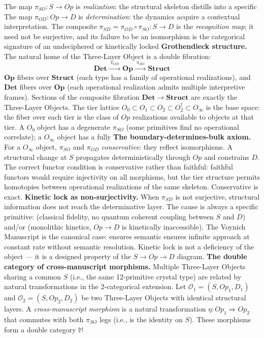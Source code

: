\documentclass[12pt,a4paper]{article}
\begin{document}
The map $\pi_{SO}: S \to Op$ is \emph{realization}: the structural skeleton distills into a specific
The map $\pi_{OD}: Op \to D$ is \emph{determination}: the dynamics acquire a contextual interpretation. The composite
$\pi_{SD} = \pi_{OD} \circ \pi_{SO}: S \to D$ is the \emph{recognition map}; it need not be surjective, and its
failure to be an isomorphism is the categorical signature of an undeciphered or kinetically locked
\textbf{Grothendieck structure.} The natural home of the Three-Layer Object is a double fibration:
\[
 \mathbf{Det} \xrightarrow{\;\pi_{OD}\;} \mathbf{Op} \xrightarrow{\;\pi_{SO}\;} \mathbf{Struct}
\]
$\mathbf{Op}$ fibers over $\mathbf{Struct}$ (each type has a family of operational realizations), and
$\mathbf{Det}$ fibers over $\mathbf{Op}$ (each operational realization admits multiple interpretive frames). Sections
of the composite fibration $\mathbf{Det} \to \mathbf{Struct}$ are exactly the Three-Layer Objects. The tier lattice
$O_0 \subset O_1 \subset O_2 \subset O_2^\dagger \subset O_{\infty}$ is the base space: the fiber over each
tier is the class of $Op$ realizations available to objects at that tier. A $O₀$ object has a degenerate $\pi_{SO}$
(some primitives find no operational correlate); a $O_{\infty}$ object has a fully
\textbf{The boundary-determines-bulk axiom.} For a $O_{\infty}$ object, $\pi_{SO}$ and $\pi_{OD}$
\emph{conservative}: they reflect isomorphisms. A structural change at $S$ propagates deterministically through $Op$
and constrains $D$. The correct functor condition is conservative rather than faithful: faithful functors would require
injectivity on all morphisms, but the tier structure permits homotopies between operational realizations of the same
skeleton. Conservative is exact.
\textbf{Kinetic lock as non-surjectivity.} When $\pi_{SD}$ is not surjective, structural information does not reach the
determinative layer. The cause is always a specific primitive:  (classical fidelity, no quantum
coherent coupling between $S$ and $D$) and/or  (monolithic kinetics, $Op \to D$ is kinetically
inaccessible). The Voynich Manuscript is the canonical case:  ensures semantic
 ensures infinite approach at constant rate without semantic resolution. Kinetic lock is not a
deficiency of the object --- it is a designed property of the $S \to Op \to D$ diagram.
\textbf{The double category of cross-manuscript morphisms.} Multiple Three-Layer Objects sharing a common $S$ (i.e.,
the same 12-primitive crystal type) are related by natural transformations in the 2-categorical extension. Let
$\mathcal{O}_1 = (S, Op_1, D_1)$ and $\mathcal{O}_2 = (S, Op_2, D_2)$ be two Three-Layer Objects with identical
structural layers. A \emph{cross-manuscript morphism} is a natural transformation $\eta: Op_1 \Rightarrow Op_2$ that
commutes with both $\pi_{SO}$ legs (i.e., is the identity on $S$). These morphisms form a double category $\mathbb{M}$
\end{document}
